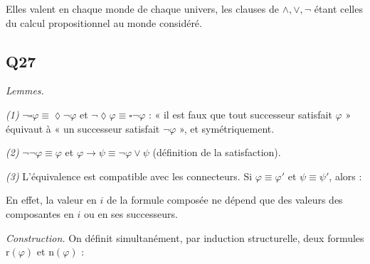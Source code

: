 \documentclass[11pt,a4paper]{article}
\providecommand{\Box}{\square}
\providecommand{\Diamond}{\lozenge}
\newcommand{\equationajustee}[1]{%
  \sbox{\boiteequation}{$\displaystyle #1$}%
  \ifdim\wd\boiteequation>\linewidth
    \[\resizebox{\linewidth}{!}{\usebox{\boiteequation}}\]%
  \else
    \[#1\]%
  \fi}
\begin{document}
Elles valent en chaque monde de chaque univers, les clauses de \(\wedge,\vee,\neg\) étant celles du calcul propositionnel au monde considéré.

\hypertarget{q27}{%
\subsection{Q27}\label{q27}}

\emph{Lemmes.}

\emph{(1)} \(\neg\Box\varphi\equiv\Diamond\neg\varphi\) et \(\neg\Diamond\varphi\equiv\Box\neg\varphi\) : « il est faux que tout successeur satisfait \(\varphi\) » équivaut à « un successeur satisfait \(\neg\varphi\) », et symétriquement.

\emph{(2)} \(\neg\neg\varphi\equiv\varphi\) et \(\varphi\to\psi\equiv\neg\varphi\vee\psi\) (définition de la satisfaction).

\emph{(3)} L'équivalence est compatible avec les connecteurs. Si \(\varphi\equiv\varphi'\) et \(\psi\equiv\psi'\), alors :

\equationajustee{
\begin{aligned}
\neg\varphi&\equiv\neg\varphi'\\
\varphi\wedge\psi&\equiv\varphi'\wedge\psi'\\
\varphi\vee\psi&\equiv\varphi'\vee\psi'\\
\Box\varphi&\equiv\Box\varphi'\\
\Diamond\varphi&\equiv\Diamond\varphi'
\end{aligned}
}

En effet, la valeur en \(i\) de la formule composée ne dépend que des valeurs des composantes en \(i\) ou en ses successeurs.

\emph{Construction.} On définit simultanément, par induction structurelle, deux formules \(\mathrm r(\varphi)\) et \(\mathrm n(\varphi)\) :
\end{document}
